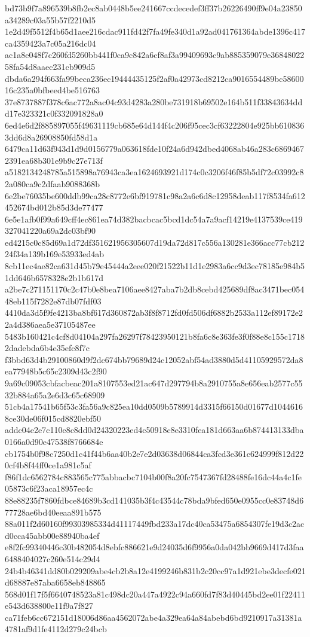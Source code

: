 {bd73b9f7a896539b8fb2ec8ab0448b5ee241667ccdecedef3ff37b26226490ff9e04a23850a34289c03a55b57f2210d5
1e2d49f5512f4b65d1aee216cdac911fd42f7fa49fe340d1a92ad041761364abde1396c417ca4359423a7c05a216dc04
ac1a8e048f7c260fd5260bb441f0ca9c842a6cf8af3a99409693c9ab885359079e3684802258fa54d8aaec231cb909d5
dbda6a294f663fa99beca236ec19444435125f2af0a42973cd8212ca9016554489bc5860016c235a0bfbeed4be516763
37e8737887f378c6ac772a8ac04c93d4283a280be731918b69502e164b511f33843634ddd17e323321c0f332091828a0
6ed4e6d2f885897055f49631119cb685e64d144f4c206f95cec3cf63222804e925bb6108363dd6d8a26908850fd58d1a
6479ca11d63f943d1d9d0156779a063618fde10f24a6d942dbed4068ab46a283c68694672391ea68b301e9b9c27e713f
a5182134248785a515898a76943ca3ea1624693921d174c0c3206f46f85b5df72c03992c82a080ca9c2dfaab9088368b
6e2be76035be600ddb99ca28c8772e6bf919781c98a2a6c6d8c12958deab117f8534fa612452674bd012b85d3de77477
6e5e1afb0f99a649cff4ec861ea74d382bacbcac5bcd1dc54a7a9acf14219e4137539ce419327041220a69a2dc03bf90
ed4215c0c85d69a1d72df351621956305607d19da72d817c556a130281e366acc77cb21224f34a139b169e53933ed4ab
8cb11ec4ae82ca631d45b79e45444a2eee020f21522b11d1e2983a6cc9d3ec78185e984b51dd646b6578328e2b1b617d
a2be7c271151170c2c47b0e8bea7106aee8427aba7b2db8cebd425689df8ac3471bec05448eb115f7282e87db07fdf03
4410da3d5f9fe4213ba8bf617d360872ab3f8f8712fd0fd506df6882b2533a112ef89172e22a4d386aea5e37105487ee
5483b160421c4cf8d04104a297fa26297f78423950121b8fa6c8e363fe3f0f88e8c155c17182dadebda6b4e35efc8f7c
f3bbd63d4b29100860d9f2dc674bb79689d24c12052abf54ad3880d5d41105929572da8ea77948b5c65c2309d43c2f90
9a69c09053cbfacbeac201a8107553ed21ac647d297794b8a2910755a8e656eab2577c5532b884a65a2e6d3c65c68909
51cb4a17541b65f53c3fa56a9c825ea10dd0509b5789914d3315f66150d01677d10446168ce30de06f015cd8820ebf50
addc04e2e7c110e8c8dd0d24320223ed4c50918c8e3310fea181d663aa6b874413133dba0166a0d90e47538f8766684e
cb1754b0f98c7250d1c41f44b6aa40b2e7e2d03638d06844ca3fcd3e361c624999f812d220cf4b8f44ff0ce1a981c5af
f86f1dc6562784c883565c775abbacbc7104b00f8a20fc7547367fd28488fe16dc44a4c1fe05873c6f23aca18957ec4c
88e88235f7860fdbce84689b3cd141035b3f4c43544c78bda9bfed650e0955cc0e83748d677728ae6bd40eeaa891b575
88a011f2d60160f99303985334d41117449fbd233a17dc40ca53475a6854307fe19d3c2acd0cca45abb00e88940ba4ef
e8f2fc99340446c30b482054d8ebfc886621e9d24035d6f9956a0da042bb9669d417d3faa6488404027c260e514c29d4
24b4b46341dd80b029209abe4cb2b8a12e4199246b831b2c20cc97a1d921ebe3decfe021d68887e87aba6658eb848865
568d01f17f5f6640748523a81c498dc20a447a4922c94a660fd7f83d40445bd2ee01f22411e543d638800e11f9a7f827
ca71feb6cc672151d18006d86aa4562072abe4a329ea64a84abebd6bd9210917a31381a4781af9d1fe4112d279c24bcb
}
